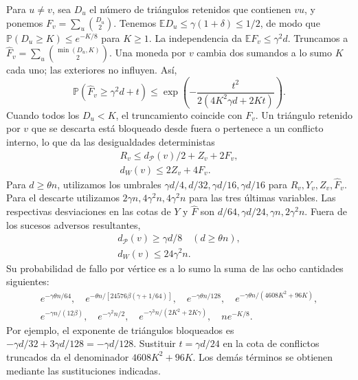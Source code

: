 \documentclass[spanish,11pt,a4paper]{article}
\begin{document}
Para \(u\ne v\), sea \(D_u\) el número de triángulos retenidos que contienen \(vu\), y ponemos \(F_v=\sum_u\binom{D_u}{2}\). Tenemos \(\mathbb ED_u\le\gamma(1+\delta)\le1/2\), de modo que \(\mathbb P(D_u\ge K)\le e^{-K/8}\) para \(K\ge1\). La independencia da \(\mathbb EF_v\le\gamma^2d\). Truncamos a \(\widehat F_v=\sum_u\binom{\min(D_u,K)}2\). Una moneda por \(v\) cambia dos sumandos a lo sumo \(K\) cada uno; las exteriores no influyen. Así, \[\mathbb P(\widehat F_v\ge\gamma^2d+t)
\le\exp\left(-\frac{t^2}{2(4K^2\gamma d+2Kt)}\right).\] Cuando todos los \(D_u<K\), el truncamiento coincide con \(F_v\). Un triángulo retenido por \(v\) que se descarta está bloqueado desde fuera o pertenece a un conflicto interno, lo que da las desigualdades deterministas \[\begin{gathered}
R_v\le d_{\mathcal P}(v)/2+Z_v+2F_v,\\
d_W(v)\le2Z_v+4F_v.
\end{gathered}\] Para \(d\ge\theta n\), utilizamos los umbrales \(\gamma d/4,d/32,\gamma d/16,\gamma d/16\) para \(R_v,Y_v,Z_v,\widehat F_v\). Para el descarte utilizamos \(2\gamma n,4\gamma^2n,4\gamma^2n\) para las tres últimas variables. Las respectivas desviaciones en las cotas de \(Y\) y \(\widehat F\) son \(d/64,\gamma d/24,\gamma n,2\gamma^2n\). Fuera de los sucesos adversos resultantes, \[\begin{gathered}
d_{\mathcal P}(v)\ge\gamma d/8\quad(d\ge\theta n),\\
d_W(v)\le24\gamma^2n.
\end{gathered}\] Su probabilidad de fallo por vértice es a lo sumo la suma de las ocho cantidades siguientes: \[\begin{gathered}
e^{-\gamma\theta n/64},\quad
e^{-\theta n/[24576\beta(\gamma+1/64)]},\quad
e^{-\gamma\theta n/128},\quad
e^{-\gamma\theta n/(4608K^2+96K)},\\
e^{-\gamma n/(12\beta)},\quad e^{-\gamma^2n/2},\quad
e^{-\gamma^3n/(2K^2+2K\gamma)},\quad ne^{-K/8}.
\end{gathered}\] Por ejemplo, el exponente de triángulos bloqueados es \(-\gamma d/32+3\gamma d/128=-\gamma d/128\). Sustituir \(t=\gamma d/24\) en la cota de conflictos truncados da el denominador \(4608K^2+96K\). Los demás términos se obtienen mediante las sustituciones indicadas.
\end{document}

